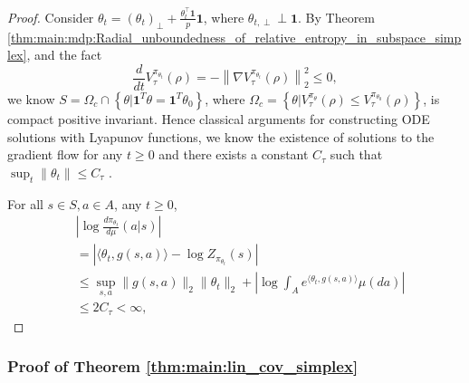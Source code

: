 \documentclass{amsart}
\theoremstyle{definition}
\begin{document}
\begin{proof}
Consider $\theta_t = (\theta_{t})_{\perp} + \frac{\theta_t^\top \mathbf{1}}{p}\mathbf{1}$, where $\theta_{t,\perp} \perp \mathbf{1}$.
By Theorem \ref{thm:main:mdp:Radial_unboundedness_of_relative_entropy_in_subspace_simplex}, and the fact 
\[
\frac{d}{dt}V_\tau^{\pi_{\theta_t}}(\rho)=-\left\|\nabla V_\tau^{\pi_{\theta_t}}(\rho)\right\|_2^2 \leq 0,
\]
we know $ S=\Omega_c \cap\left\{\theta | \mathbf{1}^T \theta=\mathbf{1}^T \theta_0\right\}$, where $\Omega_c = \left\{\theta | V_\tau^{\pi_\theta}(\rho) \leq V_\tau^{\pi_{\theta_0}}(\rho)\right\}$, is compact positive invariant. 
Hence classical arguments for constructing ODE solutions with Lyapunov functions, we know the existence of solutions to the gradient flow for any $ t \geq 0$ and there exists a constant $C_\tau$ such that $\sup_t\|\theta_t\| \leq C_\tau $ .

For all $s \in S, a \in A$, any $t \geq 0$,
\begin{align*}
&\left|\log\frac{d \pi_{\theta_t}}{d \mu}(a|s)\right|\\
& = \left| \langle \theta_t, g(s,a)\rangle - \log Z_{\pi_{\theta_t}}(s)\right| \\
& \leq \sup_{s,a}\|g(s,a)\|_2\|\theta_t\|_2 + \left|\log \int_{A} e^{\langle \theta_t,g(s,a)\rangle}\mu(da)\right|\\
& \leq 2C_\tau < \infty,
\end{align*}
\end{proof}

\subsubsection{Proof of Theorem  \ref{thm:main:lin_cov_simplex}}
\label{sec:pf_lin_cov_simplex}

\aspInitSimplex*
\LinCovSimplex*
\end{document}
